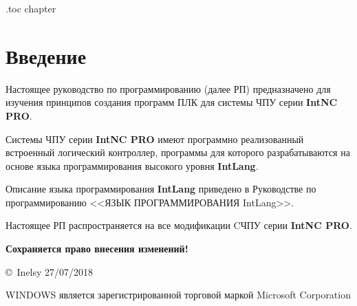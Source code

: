 
\etocsettocdepth.toc {chapter}

\chapter*{Введение}

Настоящее руководство по программированию (далее РП) предназначено для изучения  принципов создания программ ПЛК для системы \mbox{ЧПУ} серии \textbf{IntNC PRO}. 

Системы \mbox{ЧПУ} серии \textbf{IntNC PRO} имеют программно реализованный встроенный логический контроллер, программы для которого разрабатываются на основе языка программирования высокого уровня \textbf{IntLang}.

Описание языка программирования \textbf{IntLang} приведено в Руководстве по программированию <<ЯЗЫК ПРОГРАММИРОВАНИЯ IntLang>>.


Настоящее РП распространяется на все модификации CЧПУ серии \textbf{IntNC PRO}. \killoverfullbefore \BL

\textbf{Сохраняется право внесения изменений!}

\BL\BL\BL

\copyright\ Inelsy 27/07/2018

\BL

WINDOWS является зарегистрированной торговой маркой Microsoft Corporation

\newpage